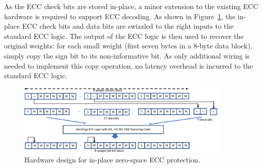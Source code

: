 \documentclass{article}
\begin{document}

As the ECC check bits are stored in-place, a minor extension to the existing ECC hardware is required to support ECC decoding. As shown in Figure~\ref{fig:hardware}, the in-place ECC check bits and data bits are swizzled to the right inputs to the standard ECC logic. The output of the ECC logic is then used to recover the original weights: for each small weight (first seven bytes in a 8-byte data block), simply copy the sign bit to its non-informative bit. As only additional wiring is needed to implement this copy operation, no latency overhead is incurred to the standard ECC logic.

\begin{figure}
    \centering
    \includegraphics[width=0.9\textwidth]{NeuRIPS2019/images/hardware/ecc-with-wot-crop.pdf}
    \caption{Hardware design for in-place zero-space ECC protection.}
    \label{fig:hardware}
\end{figure}




\end{document}
